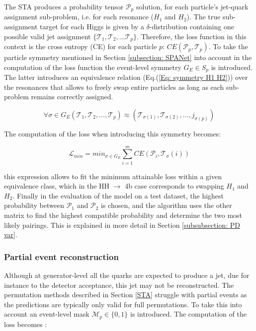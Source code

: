  The STA produces a probability tensor $\mathcal{P}_p$ solution, for each particle's jet-quark assignment sub-problem, i.e. for each resonance ($H_1$ and $H_2$). The true sub-assignment target for each Higgs is given by a $\delta$-distribution containing one possible valid jet assignment $\{ \mathcal{T}_1, \mathcal{T}_2, ... \mathcal{T}_p \}$.  Therefore, the loss function in this context is the cross entropy (CE) for each particle $p$: $CE(\mathcal{P}_p, \mathcal{T}_p)$. To take the particle symmetry mentioned in Section \ref{subsection: SPANet} into account in the computation of the loss function the event-level symmetry $G_E \in S_p$ is introduced. The latter introduces an equivalence relation (Eq.(\ref{Eq: symmetry H1 H2})) over the resonances that allows to freely swap entire particles as long as each sub-problem remains correctly assigned.

 \begin{equation}
     \forall \sigma \in G_E (\mathcal{T}_1,\mathcal{T}_2,...,\mathcal{T}_{p}) \approx (\mathcal{T}_{\sigma(1)},\mathcal{T}_{\sigma(2)},...,j_{\sigma(p)}) 
     \label{Eq: symmetry H1 H2}
 \end{equation}

 \noindent The computation of the loss when introducing this symmetry becomes:

\begin{equation}
    \mathcal{L}_{min}= min_{\sigma \in G_E} \sum_{i=1}^m CE(\mathcal{P}_i, \mathcal{T}_\sigma(i))
\end{equation}

\noindent this expression allows to fit the minimum attainable loss within a given equivalence class, which in the HH $\to$ 4b case corresponds to swapping $H_1$ and $H_2$. Finally in the evaluation of the model on a test dataset, the highest probability between $\mathcal{P}_1$ and $\mathcal{P}_2$ is chosen, and the algorithm uses the other matrix to find the highest compatible probability and determine the two most likely pairings. This is explained in more detail in Section \ref{subsubsection: PD var}.

\subsubsection{Partial event reconstruction}

Although at generator-level all the quarks are expected to produce a jet, due for instance to the detector acceptance, this jet may not be reconstructed. The permutation methods described in Section \ref{STA} struggle with partial events as the predictions are typically only valid for full permutations. To take this into account an event-level mask $\mathcal{M}_p \in \{0,1\}$ is introduced. The computation of the loss becomes \cite{SPANet}:

